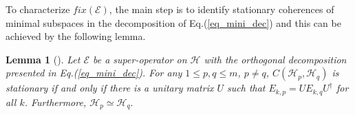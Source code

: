 \documentclass[journal]{IEEEtran}
\def\h{\ensuremath{\mathcal{H}}}
\def\e{\ensuremath{\mathcal{E}}}
\newtheorem{lemma}{Lemma}
\begin{document}
To characterize $fix(\e)$, the main step is to identify stationary coherences of minimal subspaces in  the decomposition of Eq.(\ref{eq_mini_dec}) and this can be achieved  by the following lemma.

\begin{lemma}[\cite{baumgartner2012structure}]\label{Lem_SC}
  Let $\e$ be a super-operator on $\h$ with the orthogonal decomposition presented in Eq.(\ref{eq_mini_dec}). For any $1\leq p, q\leq m$, $p\neq q$, $C(\h_p,\h_q)$ is stationary if and only if there is a unitary matrix $U$ such that 
  $E_{k,p}=UE_{k,q}U^\dagger$ for all $k$.
  Furthermore, $\h_p\simeq\h_q.$
\end{lemma}
\end{document}
